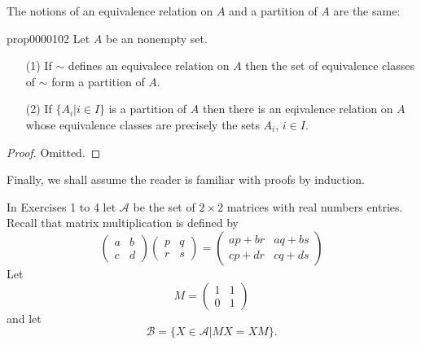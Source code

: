 \documentclass[cn,11pt,chinese]{elegantbook}
\numberwithin{equation}{section}
\begin{document}
The notions of an equivalence relation on $A$ and a partition of $A$ are the same:

\begin{proposition}{}{prop0000102}
Let $A$ be an nonempty set.
\begin{enumerate}
\item[(1)]  If $\sim$ defines an equivalece relation on $A$ then the set of equivalence classes of $\sim$ form a partition of $A$.
\item[(2)] If $\{A_i | i \in I\}$ is a partition of $A$ then there is an eqivalence relation on $A$ whose equivalence classes are precisely the sets $A_i$, $i \in I$.
\end{enumerate}
\end{proposition}

\begin{proof}
Omitted.
\end{proof}

Finally, we shall assume the reader is familiar with proofs by induction.

In Exercises 1 to 4 let $\mathcal{A}$ be the set of $2 \times 2$ matrices with real numbers entries. Recall that matrix multiplication is defined by
\[
\begin{pmatrix}a & b\\ c & d\end{pmatrix}\begin{pmatrix}p & q\\r & s\end{pmatrix}=
\begin{pmatrix}ap+br & aq + bs\\cp+dr& cq + ds\end{pmatrix}
\]
Let
\[
M = \begin{pmatrix}1 & 1 \\0 & 1\end{pmatrix}
\]
and let 
\[
\mathcal{B} = \{X \in \mathcal{A} | MX = XM\}.
\]
\end{document}
